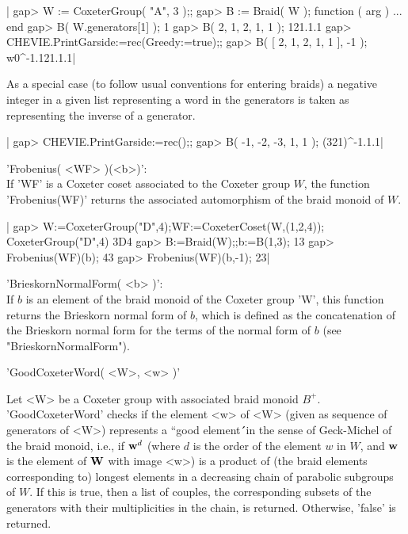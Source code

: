 |    gap> W := CoxeterGroup( "A", 3 );;
    gap> B := Braid( W );
    function ( arg ) ... end
    gap> B( W.generators[1] );
    1
    gap> B( 2, 1, 2, 1, 1 );
    121.1.1
    gap> CHEVIE.PrintGarside:=rec(Greedy:=true);;
    gap> B( [ 2, 1, 2, 1, 1 ], -1 );
    w0^-1.121.1.1|

As  a  special  case  (to  follow  usual conventions for entering braids) a
negative  integer in a given list representing  a word in the generators is
taken as representing the inverse of a generator.

|    gap> CHEVIE.PrintGarside:=rec();;
    gap> B( -1, -2, -3, 1, 1 );
    (321)^-1.1.1|


'Frobenius(  <WF> )(<b>)':\\ If  'WF' is a  Coxeter coset associated to the
Coxeter  group  $W$,  the  function  'Frobenius(WF)' returns the associated
automorphism of the braid monoid of $W$.

|    gap> W:=CoxeterGroup("D",4);WF:=CoxeterCoset(W,(1,2,4));
    CoxeterGroup("D",4)
    3D4
    gap> B:=Braid(W);;b:=B(1,3);
    13
    gap> Frobenius(WF)(b);
    43
    gap> Frobenius(WF)(b,-1);
    23|

'BrieskornNormalForm( <b> )':\\ If $b$ is an element of the braid monoid of
the  Coxeter group 'W', this function  returns the Brieskorn normal form of
$b$, which is defined as the concatenation of the Brieskorn normal form for
the terms of the normal form of $b$ (see "BrieskornNormalForm").


'GoodCoxeterWord( <W>, <w> )'

Let   <W>  be  a   Coxeter  group  with   associated  braid  monoid  $B^+$.
'GoodCoxeterWord'  checks if the  element <w> of  <W> (given as sequence of
generators  of  <W>)  represents  a  ``good  element\'\'\  in  the sense of
Geck-Michel \cite{GM97} of the braid monoid, i.e., if ${\bf w}^d$ (where $d$ is
the order of the element $w$ in $W$, and ${\bf w}$ is the element of ${\bf W}$ with
image  <w>) is a  product of (the  braid elements corresponding to) longest
elements  in a decreasing chain  of parabolic subgroups of  $W$. If this is
true,  then a list of couples,  the corresponding subsets of the generators
with  their multiplicities in the chain, is returned. Otherwise, 'false' is
returned.

